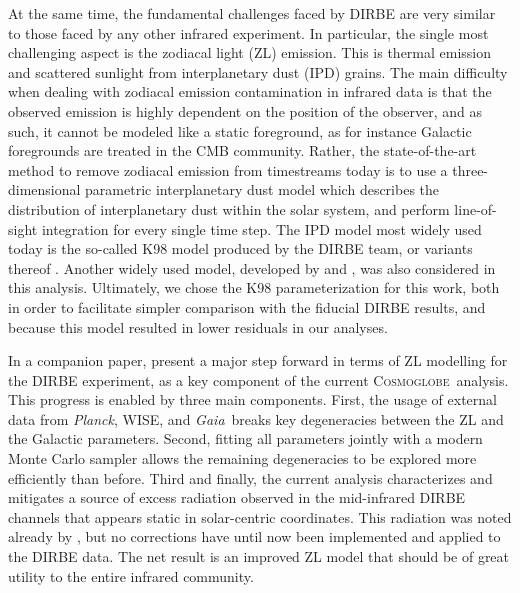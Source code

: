 \documentclass{aa}
\def\Planck{\textit{Planck}}
\def\GAIA{\textit{Gaia}}
\newcommand{\cosmoglobe}{\textsc{Cosmoglobe}}
\begin{document}
At the same time, the fundamental challenges faced by DIRBE are very similar to those faced by any other infrared experiment. In particular, the single most challenging aspect is the zodiacal light (ZL) emission. This is thermal emission and scattered sunlight from interplanetary dust (IPD) grains. The main difficulty when dealing with zodiacal emission contamination in infrared data is that the observed emission is highly dependent on the position of the observer, and as such, it cannot be modeled like a static foreground, as for instance Galactic foregrounds are treated in the CMB community. Rather, the state-of-the-art method to remove zodiacal emission from timestreams today is to use a three-dimensional parametric interplanetary dust model which describes the distribution of interplanetary dust within the solar system, and perform line-of-sight integration for every single time step. The IPD model most widely used today is the so-called K98 model \citep{kelsall1998} produced by the DIRBE team, or variants thereof \citep[e.g.,][]{planck2013-pip88}. {Another widely used model, developed by \citet{wright:1998} and \citet{gorjian:2000}, was also considered in this analysis. Ultimately, we chose the K98 parameterization for this work, both in order to facilitate simpler comparison with the fiducial DIRBE results, and because this model resulted in lower residuals in our analyses.}

In a companion paper, \citet{CG02_02} present a major step forward in terms of ZL modelling for the DIRBE experiment, as a key component of the current \cosmoglobe\ analysis. This progress is enabled by three main components. First, the usage of external data from \Planck, WISE, and \GAIA\ breaks key degeneracies between the ZL and the Galactic parameters. Second, fitting all parameters jointly with a modern Monte Carlo sampler allows the remaining degeneracies to be explored more efficiently than before. Third and finally, the current analysis characterizes and mitigates a source of excess radiation observed in the mid-infrared DIRBE channels that appears static in solar-centric coordinates. This radiation was noted already by \citet{leinert:1998}, but no corrections have until now been implemented and applied to the DIRBE data. The net result is an improved ZL model that should be of great utility to the entire infrared community.
\end{document}
